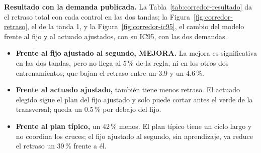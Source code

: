 \noindent\textbf{Resultado con la demanda publicada.} La
Tabla~\ref{tab:corredor-resultado} da el retraso total con cada control
en las dos tandas; la Figura~\ref{fig:corredor-retraso}, el de la
tanda 1, y la Figura~\ref{fig:corredor-ic95}, el cambio del modelo
frente al fijo y al actuado ajustados, con su IC95, con las dos
demandas.
\begin{itemize}
  \item \textbf{Frente al fijo ajustado al segundo, MEJORA.} La mejora
    es significativa en las dos tandas, pero no llega al 5\,\% de la
    regla, ni en los otros dos entrenamientos, que bajan el retraso entre
    un 3.9 y un 4.6\,\%.
  \item \textbf{Frente al actuado ajustado,} también tiene menos retraso.
    El actuado elegido sigue el plan del fijo ajustado y solo puede cortar
    antes el verde de la transversal; queda un 0.5\,\% por debajo del
    fijo.
  \item \textbf{Frente al plan típico,} un 42\,\% menos. El plan típico
    tiene un ciclo largo y no coordina los cruces; el fijo ajustado al
    segundo, sin aprendizaje, ya reduce el retraso un 39\,\% frente a
    él.
\end{itemize}


